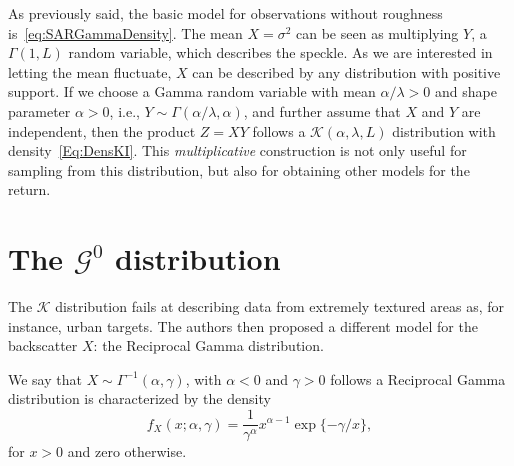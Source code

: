 \documentclass{beamer}
\begin{document}
\begin{frame}
As previously said, the basic model for observations without roughness is~\eqref{eq:SARGammaDensity}.
The mean $X=\sigma^2$ can be seen as multiplying $Y$, a $\Gamma(1,L)$ random variable, which describes the speckle.
As we are interested in letting the mean fluctuate, $X$ can be described by any distribution with positive support.
If we choose a Gamma random variable with mean $\alpha/\lambda>0$ and shape parameter $\alpha>0$, i.e., $Y\sim\Gamma(\alpha/\lambda,\alpha)$, and further assume that $X$ and $Y$ are independent, then the product $Z=XY$ follows a $\mathcal{K}(\alpha,\lambda,L)$ distribution with density~\eqref{Eq:DensKI}.
This \textit{multiplicative} construction is not only useful for sampling from this distribution, but also for obtaining other models for the return.
\end{frame}


\section{The $\mathcal G^0$ distribution}

\begin{frame}
The $\mathcal{K}$ distribution fails at describing data from extremely textured areas as, for instance, urban targets.
The authors then proposed a different model for the backscatter $X$: the Reciprocal Gamma distribution.

We say that $X\sim{\Gamma^{-1}}(\alpha,\gamma)$, with $\alpha<0$ and $\gamma>0$ follows a 
Reciprocal Gamma distribution is characterized by the density
\begin{equation}
f_X(x;\alpha,\gamma) = \frac{1}{\gamma^\alpha} x^{\alpha-1} \exp\{-\gamma/x\},
\label{Eq:IGdensity}
\end{equation}
for $x>0$ and zero otherwise.
\end{frame}
\end{document}
